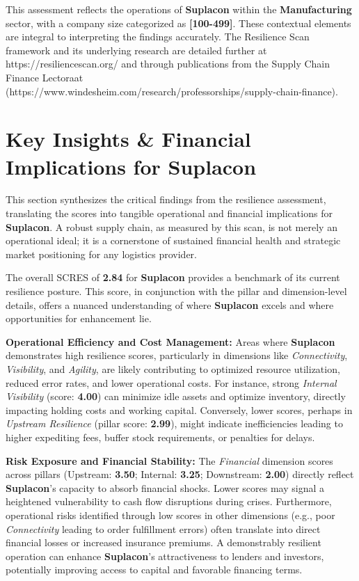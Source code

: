 \documentclass[
  oneside,
  open=any,
  fontsize=11pt]{scrbook}
\begin{document}
This assessment reflects the operations of \textbf{Suplacon} within the
\textbf{Manufacturing} sector, with a company size categorized as
\textbf{{[}100-499{]}}. These contextual elements are integral to
interpreting the findings accurately. The Resilience Scan framework and
its underlying research are detailed further at
https://resiliencescan.org/ and through publications from the Supply
Chain Finance Lectoraat
(https://www.windesheim.com/research/professorships/supply-chain-finance).

\chapter{Key Insights \& Financial Implications for
Suplacon}\label{key-insights-financial-implications-for-suplacon}

This section synthesizes the critical findings from the resilience
assessment, translating the scores into tangible operational and
financial implications for \textbf{Suplacon}. A robust supply chain, as
measured by this scan, is not merely an operational ideal; it is a
cornerstone of sustained financial health and strategic market
positioning for any logistics provider.

The overall SCRES of \textbf{2.84} for \textbf{Suplacon} provides a
benchmark of its current resilience posture. This score, in conjunction
with the pillar and dimension-level details, offers a nuanced
understanding of where \textbf{Suplacon} excels and where opportunities
for enhancement lie.

\textbf{Operational Efficiency and Cost Management:} Areas where
\textbf{Suplacon} demonstrates high resilience scores, particularly in
dimensions like \emph{Connectivity}, \emph{Visibility}, and
\emph{Agility}, are likely contributing to optimized resource
utilization, reduced error rates, and lower operational costs. For
instance, strong \emph{Internal Visibility} (score: \textbf{4.00}) can
minimize idle assets and optimize inventory, directly impacting holding
costs and working capital. Conversely, lower scores, perhaps in
\emph{Upstream Resilience} (pillar score: \textbf{2.99}), might indicate
inefficiencies leading to higher expediting fees, buffer stock
requirements, or penalties for delays.

\textbf{Risk Exposure and Financial Stability:} The \emph{Financial}
dimension scores across pillars (Upstream: \textbf{3.50}; Internal:
\textbf{3.25}; Downstream: \textbf{2.00}) directly reflect
\textbf{Suplacon}'s capacity to absorb financial shocks. Lower scores
may signal a heightened vulnerability to cash flow disruptions during
crises. Furthermore, operational risks identified through low scores in
other dimensions (e.g., poor \emph{Connectivity} leading to order
fulfillment errors) often translate into direct financial losses or
increased insurance premiums. A demonstrably resilient operation can
enhance \textbf{Suplacon}'s attractiveness to lenders and investors,
potentially improving access to capital and favorable financing terms.
\end{document}
